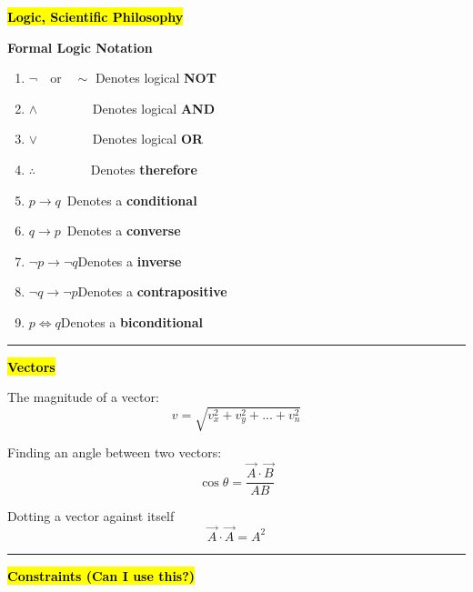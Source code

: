\documentclass[	DIV=calc,%
							paper=a4,%
							fontsize=11pt,%
							twocolumn]{scrartcl} %
\date{\today} %
\newcommand{\hformbar}[1]{\vspace{5pt}\hrule\vspace{10pt}} %
\newcommand{\formdesc}[1]{\noindent\textbf{#1}}
\begin{document}
\thispagestyle{fancy} 	%
\hspace{10pt}

\formdesc{\hl{Logic, Scientific Philosophy}}

\textbf{Formal Logic Notation}
\begin{enumerate}
    \item $\neg\quad\text{or}\quad\sim$
        Denotes logical \textbf{NOT}
    \item $\land\qquad\qquad$
        Denotes logical \textbf{AND}
    \item $\lor\qquad\qquad$
        Denotes logical \textbf{OR}
    \item $\therefore\qquad\qquad$
        Denotes \textbf{therefore}
    \item $p\rightarrow q$\qquad \  Denotes a \textbf{conditional}
    \item $q\rightarrow p$\qquad \ Denotes a \textbf{converse}
    \item $\neg p\rightarrow\neg q$\quad Denotes a \textbf{inverse}
    \item $\neg q\rightarrow\neg p$\quad Denotes a \textbf{contrapositive}
    \item $p\iff q$\quad Denotes a \textbf{biconditional}
\end{enumerate}

\hformbar{}


\formdesc{\hl{Vectors}}

The magnitude of a vector:
\begin{equation}
    v = \sqrt{v_x^2 + v_y^2 + ... + v_n^2}
\end{equation}

Finding an angle between two vectors:
\begin{equation}
    \cos\theta = \frac{\vec A \cdot \vec B}{AB}
\end{equation}

Dotting a vector against itself
\begin{equation}
    \vec A\cdot\vec A = A^2
\end{equation}
\hformbar{}

\formdesc{\hl{Constraints (Can I use this?)}}
\end{document}
